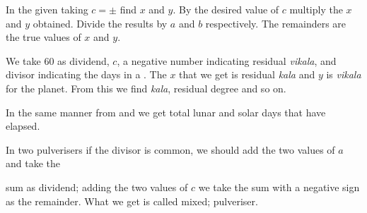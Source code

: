 \documentclass[]{article}
\begin{document}
{\begin{quote}  {
}  \end{quote}

{In the given {} taking $c = \pm$ find $x$ and $y$. By the desired value of
$c$ {} multiply the $x$ and $y$ obtained. Divide the results by $a$ and $b$
respectively. The remainders are the true values of $x$ and $y$.}

\begin{quote}  {
}  \end{quote}

{We take 60 as dividend, $c$, a negative number indicating residual
\textit{vikala}, and divisor indicating the days in a {}. The $x$ that we get is
residual \textit{kala} and $y$ is \textit{vikala} for the planet. From this we find \textit{kala},
residual degree and so on.}

{In the same manner from {} and {} we get total lunar and
solar days that have elapsed.}

\begin{quote}  {
}  \end{quote}

{In two pulverisers if the divisor is common, we should add the two
values of $a$ and take the }
\newpage
\large

\noindent sum as dividend; adding the two values of $c$ we take the sum with a
negative sign as the remainder. What we get is called mixed; pulveriser.

\begin{quote}  {
}  \end{quote}

}
\end{document}
